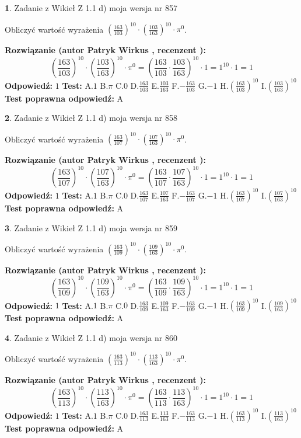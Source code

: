 \documentclass[12pt, a4paper]{article}
\theoremstyle{definition} %
\newtheorem{zad}{}
\newcommand{\zadStart}[1]{\begin{zad}#1\newline}
\newcommand{\zadStop}{\end{zad}}
\newcommand{\rozwStart}[2]{\noindent \textbf{Rozwiązanie (autor #1 , recenzent #2): }\newline}
\newcommand{\rozwStop}{\newline}
\newcommand{\odpStart}{\noindent \textbf{Odpowiedź:}\newline}
\newcommand{\odpStop}{\newline}
\newcommand{\testStart}{\noindent \textbf{Test:}\newline}
\newcommand{\testStop}{\newline}
\newcommand{\kluczStart}{\noindent \textbf{Test poprawna odpowiedź:}\newline}
\newcommand{\kluczStop}{\newline}
\begin{document}
\zadStart{Zadanie z Wikieł Z 1.1 d) moja wersja nr 857}

Obliczyć wartość wyrażenia $(\frac{163}{103})^{10} \cdot (\frac{103}{163})^{10} \cdot \pi^{0}$.
\zadStop
\rozwStart{Patryk Wirkus}{}
$$(\frac{163}{103})^{10} \cdot (\frac{103}{163})^{10} \cdot \pi^{0} = (\frac{163}{103} \cdot \frac{103}{163})^{10} \cdot 1 = 1^{10} \cdot 1 = 1$$
\rozwStop
\odpStart
$1$
\odpStop
\testStart
A.$1$ B.$\pi$ C.$0$ D.$\frac{163}{103}$ E.$\frac{103}{163}$
F.$-\frac{163}{103}$ G.$-1$
H.$(\frac{163}{103})^{10}$
I.$(\frac{103}{163})^{10}$
\testStop
\kluczStart
A
\kluczStop



\zadStart{Zadanie z Wikieł Z 1.1 d) moja wersja nr 858}

Obliczyć wartość wyrażenia $(\frac{163}{107})^{10} \cdot (\frac{107}{163})^{10} \cdot \pi^{0}$.
\zadStop
\rozwStart{Patryk Wirkus}{}
$$(\frac{163}{107})^{10} \cdot (\frac{107}{163})^{10} \cdot \pi^{0} = (\frac{163}{107} \cdot \frac{107}{163})^{10} \cdot 1 = 1^{10} \cdot 1 = 1$$
\rozwStop
\odpStart
$1$
\odpStop
\testStart
A.$1$ B.$\pi$ C.$0$ D.$\frac{163}{107}$ E.$\frac{107}{163}$
F.$-\frac{163}{107}$ G.$-1$
H.$(\frac{163}{107})^{10}$
I.$(\frac{107}{163})^{10}$
\testStop
\kluczStart
A
\kluczStop



\zadStart{Zadanie z Wikieł Z 1.1 d) moja wersja nr 859}

Obliczyć wartość wyrażenia $(\frac{163}{109})^{10} \cdot (\frac{109}{163})^{10} \cdot \pi^{0}$.
\zadStop
\rozwStart{Patryk Wirkus}{}
$$(\frac{163}{109})^{10} \cdot (\frac{109}{163})^{10} \cdot \pi^{0} = (\frac{163}{109} \cdot \frac{109}{163})^{10} \cdot 1 = 1^{10} \cdot 1 = 1$$
\rozwStop
\odpStart
$1$
\odpStop
\testStart
A.$1$ B.$\pi$ C.$0$ D.$\frac{163}{109}$ E.$\frac{109}{163}$
F.$-\frac{163}{109}$ G.$-1$
H.$(\frac{163}{109})^{10}$
I.$(\frac{109}{163})^{10}$
\testStop
\kluczStart
A
\kluczStop



\zadStart{Zadanie z Wikieł Z 1.1 d) moja wersja nr 860}

Obliczyć wartość wyrażenia $(\frac{163}{113})^{10} \cdot (\frac{113}{163})^{10} \cdot \pi^{0}$.
\zadStop
\rozwStart{Patryk Wirkus}{}
$$(\frac{163}{113})^{10} \cdot (\frac{113}{163})^{10} \cdot \pi^{0} = (\frac{163}{113} \cdot \frac{113}{163})^{10} \cdot 1 = 1^{10} \cdot 1 = 1$$
\rozwStop
\odpStart
$1$
\odpStop
\testStart
A.$1$ B.$\pi$ C.$0$ D.$\frac{163}{113}$ E.$\frac{113}{163}$
F.$-\frac{163}{113}$ G.$-1$
H.$(\frac{163}{113})^{10}$
I.$(\frac{113}{163})^{10}$
\testStop
\kluczStart
A
\kluczStop
\end{document}
